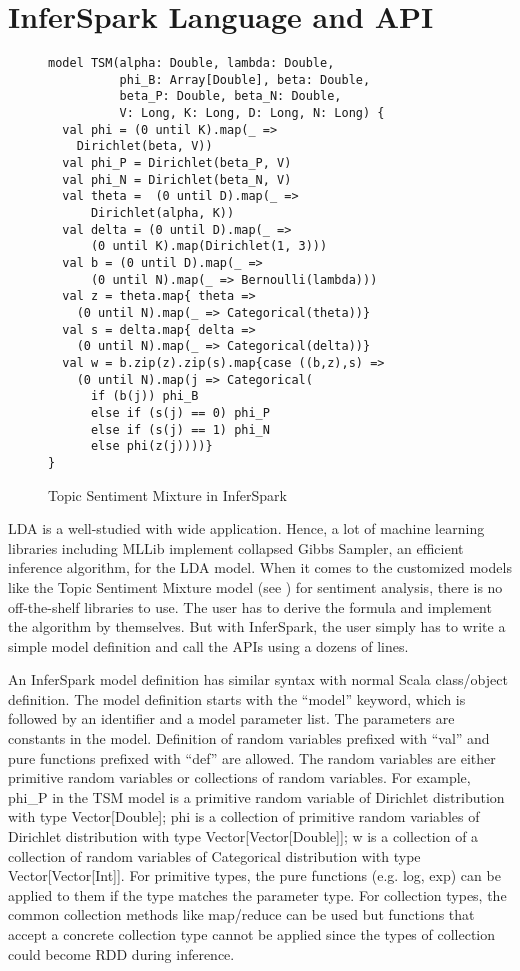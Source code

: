 \section{InferSpark Language and API}
\label{sec:pplang}

\begin{figure}[!h]
\footnotesize
\centering
\begin{verbatim}
model TSM(alpha: Double, lambda: Double, 
          phi_B: Array[Double], beta: Double, 
          beta_P: Double, beta_N: Double,
          V: Long, K: Long, D: Long, N: Long) {
  val phi = (0 until K).map(_ => 
    Dirichlet(beta, V))
  val phi_P = Dirichlet(beta_P, V)
  val phi_N = Dirichlet(beta_N, V)
  val theta =  (0 until D).map(_ =>
      Dirichlet(alpha, K))
  val delta = (0 until D).map(_ =>
      (0 until K).map(Dirichlet(1, 3)))
  val b = (0 until D).map(_ =>
      (0 until N).map(_ => Bernoulli(lambda)))
  val z = theta.map{ theta =>
    (0 until N).map(_ => Categorical(theta))}
  val s = delta.map{ delta =>
    (0 until N).map(_ => Categorical(delta))}
  val w = b.zip(z).zip(s).map{case ((b,z),s) =>
    (0 until N).map(j => Categorical(
      if (b(j)) phi_B
      else if (s(j) == 0) phi_P
      else if (s(j) == 1) phi_N
      else phi(z(j))))}
}
\end{verbatim}
\caption{Topic Sentiment Mixture in InferSpark}
\label{fig:TSM_pp}
\end{figure}

LDA is a well-studied with wide application. Hence, a lot of machine learning
libraries including MLLib implement collapsed Gibbs Sampler, an efficient
inference algorithm, for the LDA model. When it comes to the customized models
like the Topic Sentiment Mixture model (see ) for
sentiment analysis, there is no off-the-shelf libraries to use. The user has
to derive the formula and implement the algorithm by themselves. But with
InferSpark, the user simply has to write a simple model definition and call
the APIs using a dozens of lines.

An InferSpark model definition has similar syntax with normal Scala
class/object definition. The model definition starts with the ``model''
keyword, which is followed by an identifier and a model parameter list. The
parameters are constants in the model. Definition of random variables prefixed
with ``val'' and pure functions prefixed with ``def'' are allowed. The random
variables are either primitive random variables or collections of random
variables. For example, phi\_P in the TSM model is a primitive random variable
of Dirichlet distribution with type Vector[Double]; phi is a collection of
primitive random variables of Dirichlet distribution with type
Vector[Vector[Double]]; w is a collection of a collection of random variables
of Categorical distribution with type Vector[Vector[Int]]. For primitive
types, the pure functions (e.g. log, exp) can be applied to them if the type
matches the parameter type. For collection types, the common collection
methods like map/reduce can be used but functions that accept a concrete
collection type cannot be applied since the types of collection could become
RDD during inference.

